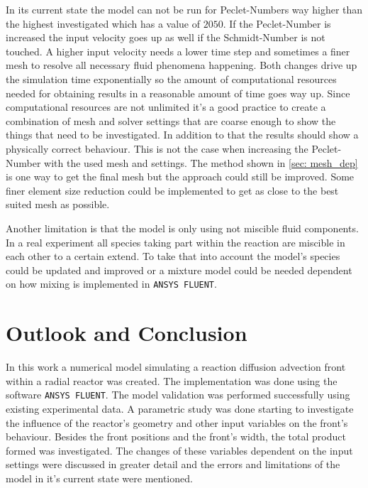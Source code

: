 \documentclass[../thesis.tex]{subfiles}
\begin{document}
In its current state the model can not be run for Peclet-Numbers way higher than the highest investigated which has a value of $2050$. If the Peclet-Number is increased the input velocity goes up as well if the Schmidt-Number is not touched. A higher input velocity needs a lower time step and sometimes a finer mesh to resolve all necessary fluid phenomena happening. Both changes drive up the simulation time exponentially so the amount of computational resources needed for obtaining results in a reasonable amount of time goes way up. Since computational resources are not unlimited it's a good practice to create a combination of mesh and solver settings that are coarse enough to show the things that need to be investigated. In addition to that the results should show a physically correct behaviour. This is not the case when increasing the Peclet-Number with the used mesh and settings. The method shown in \autoref{sec: mesh_dep} is one way to get the final mesh but the approach could still be improved. Some finer element size reduction could be implemented to get as close to the best suited mesh as possible. 

Another limitation is that the model is only using not miscible fluid components. In a real experiment all species taking part within the reaction are miscible in each other to a certain extend. To take that into account the model's species could be updated and improved or a mixture model could be needed dependent on how mixing is implemented in \texttt{ANSYS FLUENT}.

\chapter{Outlook and Conclusion}
\label{chp:out_con}
In this work a numerical model simulating a reaction diffusion advection front within a radial reactor was created. The implementation was done using the software \texttt{ANSYS FLUENT}. The model validation was performed successfully using existing experimental data. A parametric study was done starting to investigate the influence of the reactor's geometry and other input variables on the front's behaviour. Besides the front positions and the front's width, the total product formed was investigated. The changes of these variables dependent on the input settings were discussed in greater detail and the errors and limitations of the model in it's current state were mentioned.
\end{document}

